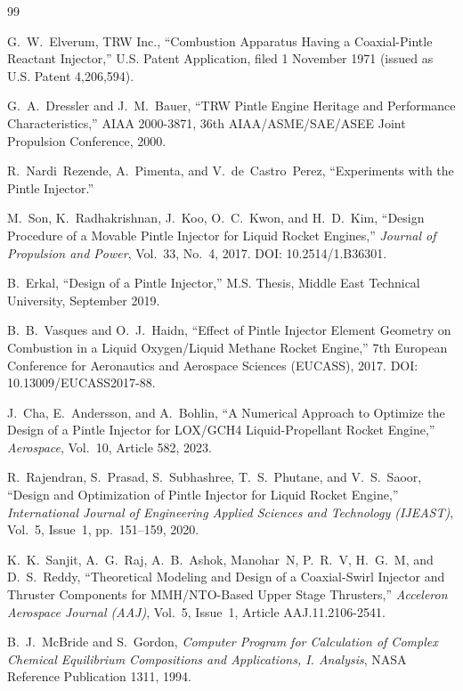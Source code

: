 \documentclass[11pt,a4paper]{article}
\begin{document}
\begin{thebibliography}{99}

 G.~W.~Elverum, TRW Inc., ``Combustion Apparatus Having a Coaxial-Pintle Reactant Injector,'' U.S. Patent Application, filed 1 November 1971 (issued as U.S. Patent 4{,}206{,}594).

 G.~A.~Dressler and J.~M.~Bauer, ``TRW Pintle Engine Heritage and Performance Characteristics,'' AIAA 2000-3871, 36th AIAA/ASME/SAE/ASEE Joint Propulsion Conference, 2000.

 R.~Nardi~Rezende, A.~Pimenta, and V.~de~Castro~Perez, ``Experiments with the Pintle Injector.''

 M.~Son, K.~Radhakrishnan, J.~Koo, O.~C.~Kwon, and H.~D.~Kim, ``Design Procedure of a Movable Pintle Injector for Liquid Rocket Engines,'' \emph{Journal of Propulsion and Power}, Vol.~33, No.~4, 2017. DOI: 10.2514/1.B36301.

 B.~Erkal, ``Design of a Pintle Injector,'' M.S. Thesis, Middle East Technical University, September 2019.

 B.~B.~Vasques and O.~J.~Haidn, ``Effect of Pintle Injector Element Geometry on Combustion in a Liquid Oxygen/Liquid Methane Rocket Engine,'' 7th European Conference for Aeronautics and Aerospace Sciences (EUCASS), 2017. DOI: 10.13009/EUCASS2017-88.

 J.~Cha, E.~Andersson, and A.~Bohlin, ``A Numerical Approach to Optimize the Design of a Pintle Injector for LOX/GCH4 Liquid-Propellant Rocket Engine,'' \emph{Aerospace}, Vol.~10, Article 582, 2023.

 R.~Rajendran, S.~Prasad, S.~Subhashree, T.~S.~Phutane, and V.~S.~Saoor, ``Design and Optimization of Pintle Injector for Liquid Rocket Engine,'' \emph{International Journal of Engineering Applied Sciences and Technology (IJEAST)}, Vol.~5, Issue~1, pp.~151--159, 2020.

 K.~K.~Sanjit, A.~G.~Raj, A.~B.~Ashok, Manohar~N, P.~R.~V, H.~G.~M, and D.~S.~Reddy, ``Theoretical Modeling and Design of a Coaxial-Swirl Injector and Thruster Components for MMH/NTO-Based Upper Stage Thrusters,'' \emph{Acceleron Aerospace Journal (AAJ)}, Vol.~5, Issue~1, Article AAJ.11.2106-2541.

 B.~J.~McBride and S.~Gordon, \emph{Computer Program for Calculation of Complex Chemical Equilibrium Compositions and Applications, I. Analysis}, NASA Reference Publication 1311, 1994.


\end{thebibliography}
\end{document}
